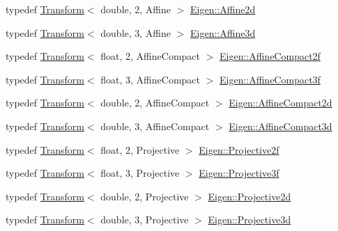 \begin{DoxyCompactItemize}
\item 
typedef \mbox{\hyperlink{class_eigen_1_1_transform}{Transform}}$<$ double, 2, Affine $>$ \mbox{\hyperlink{group___geometry___module_gac1c9dbf666dc310b51253302a01136fe}{Eigen\+::\+Affine2d}}
\item 
typedef \mbox{\hyperlink{class_eigen_1_1_transform}{Transform}}$<$ double, 3, Affine $>$ \mbox{\hyperlink{group___geometry___module_gab0c57680a4d0de53bc749378b0320175}{Eigen\+::\+Affine3d}}
\item 
typedef \mbox{\hyperlink{class_eigen_1_1_transform}{Transform}}$<$ float, 2, Affine\+Compact $>$ \mbox{\hyperlink{group___geometry___module_gae88f296fba2a506eb3397569d762da27}{Eigen\+::\+Affine\+Compact2f}}
\item 
typedef \mbox{\hyperlink{class_eigen_1_1_transform}{Transform}}$<$ float, 3, Affine\+Compact $>$ \mbox{\hyperlink{group___geometry___module_ga372437883db5fe0332141ae30d4f501a}{Eigen\+::\+Affine\+Compact3f}}
\item 
typedef \mbox{\hyperlink{class_eigen_1_1_transform}{Transform}}$<$ double, 2, Affine\+Compact $>$ \mbox{\hyperlink{group___geometry___module_ga635eb91d48c86041a21d7616fff7888e}{Eigen\+::\+Affine\+Compact2d}}
\item 
typedef \mbox{\hyperlink{class_eigen_1_1_transform}{Transform}}$<$ double, 3, Affine\+Compact $>$ \mbox{\hyperlink{group___geometry___module_gabcf74c0e194ea4e487284e28a9817a34}{Eigen\+::\+Affine\+Compact3d}}
\item 
typedef \mbox{\hyperlink{class_eigen_1_1_transform}{Transform}}$<$ float, 2, Projective $>$ \mbox{\hyperlink{group___geometry___module_ga20f7da72f3045561b8cf2dfaceed797f}{Eigen\+::\+Projective2f}}
\item 
typedef \mbox{\hyperlink{class_eigen_1_1_transform}{Transform}}$<$ float, 3, Projective $>$ \mbox{\hyperlink{group___geometry___module_ga0546746224f5fd54d47ac8390eaefdd0}{Eigen\+::\+Projective3f}}
\item 
typedef \mbox{\hyperlink{class_eigen_1_1_transform}{Transform}}$<$ double, 2, Projective $>$ \mbox{\hyperlink{group___geometry___module_gad3b2e23c2704a22c957573bcaa362d2a}{Eigen\+::\+Projective2d}}
\item 
typedef \mbox{\hyperlink{class_eigen_1_1_transform}{Transform}}$<$ double, 3, Projective $>$ \mbox{\hyperlink{group___geometry___module_ga3d2c61fbea04b09e4925a2e321b8b67c}{Eigen\+::\+Projective3d}}
\item 
\mbox{\label{group___geometry___module_ga29fb4163542a80994522fa51cead466b}} 

\end{DoxyCompactItemize}
